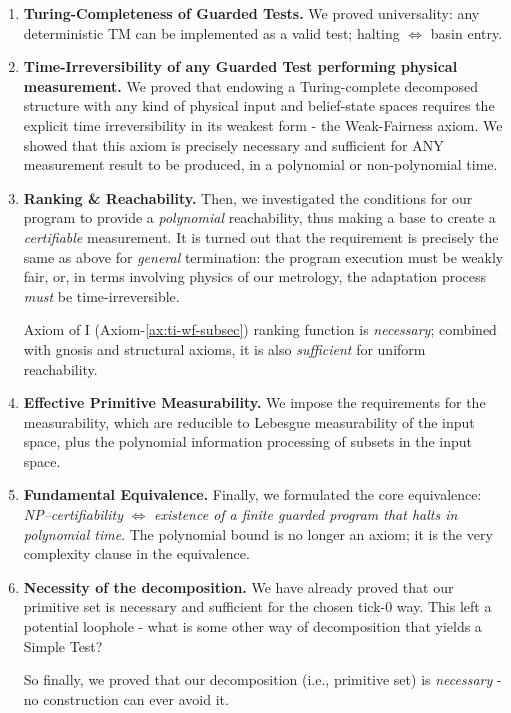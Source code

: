 \documentclass[12pt]{article}
\theoremstyle{definition}
\theoremstyle{plain}
\begin{document}
\begin{enumerate}[label=\textbf{C\arabic*}. , leftmargin=2em]
  \item \textbf{Turing-Completeness of Guarded Tests.}  
        We proved universality: any deterministic TM can be implemented as a valid test; halting $\iff$ basin entry.  
  \item \textbf{Time-Irreversibility of any Guarded Test performing physical measurement.} We proved that endowing a Turing-complete decomposed structure with any kind of physical input and belief-state spaces requires the explicit time irreversibility in its weakest form - the Weak-Fairness axiom. We showed that this axiom is precisely necessary and sufficient for ANY measurement result to be produced, in a polynomial or non-polynomial time. 
  \item \textbf{Ranking \& Reachability.}  
        Then, we investigated the conditions for our program to provide a \emph{polynomial} reachability, thus making a base to create a \emph{certifiable} measurement. It is turned out that the requirement is precisely the same as above for \emph{general} termination: the program execution must be weakly fair, or, in terms involving physics of our metrology, the adaptation process \emph{must} be time-irreversible.      
        
        Axiom of I (Axiom-\ref{ax:ti-wf-subsec}) ranking function is \emph{necessary}; combined with gnosis and structural axioms, it is also \emph{sufficient} for uniform reachability.  
        
  \item \textbf{Effective Primitive Measurability.} We impose the requirements for the measurability, which are reducible to Lebesgue measurability of the input space, plus the polynomial information processing of subsets in the input space.

  \item \textbf{Fundamental Equivalence.}  
        Finally, we formulated the core equivalence: \emph{NP–certifiability} $\Longleftrightarrow$ \emph{existence of a finite guarded program that halts in polynomial time}.  The polynomial bound is no longer an axiom; it is the very complexity clause in the equivalence.
  \item \textbf{Necessity of the decomposition.} We have already proved that our primitive set is necessary and sufficient for the chosen tick-0 way. This left a potential loophole - what is some other way of decomposition that yields a Simple Test?
  
  So finally, we proved that our decomposition (i.e., primitive set) is \emph{necessary} - no construction can ever avoid it.

\end{enumerate}
\end{document}
